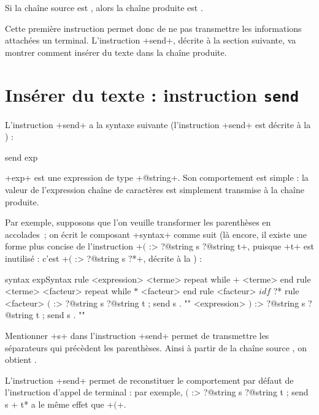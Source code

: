 Si la chaîne source est , alors la chaîne produite est .

Cette première instruction permet donc de ne pas transmettre les informations attachées un terminal. L'instruction \ggsq+send+, décrite à la section suivante, va montrer comment insérer du texte dans la chaîne produite.










\section{Insérer du texte : instruction \texttt{send}}

L'instruction \ggsq+send+ a la syntaxe suivante (l'instruction \ggsq+send+ est décrite à la ) :

\begin{galgas4}
send exp
\end{galgas4}

\ggsq+exp+ est une expression de type \ggsq+@string+. Son comportement est simple : la valeur de l'expression chaîne de caractères est simplement transmise à la chaîne produite.

Par exemple, supposons que l'on veuille transformer les parenthèses en accolades~; on écrit le composant \ggsq+syntax+ comme suit (là encore, il existe une forme plus concise de l'instruction \ggsq+$($ :> ?@string s ?@string t+, puisque \ggsq+t+ est inutilisé : c'est \ggsq+$($ :> ?@string s ?*+, décrite  à la ) :
\begin{galgas4}
syntax expSyntax {
  rule <expression> {
    <terme>
    repeat while $+$ <terme> end
  }
  rule <terme> {
    <facteur>
    repeat while $*$ <facteur> end
  }
  rule <facteur> {
    $idf$ ?*
  }
  rule <facteur> {
    $($ :> ?@string s ?@string t ; send s . "{"
    <expression>
    $)$ :> ?@string s ?@string t ; send s . "}"
  }
}
\end{galgas4}

Mentionner \ggsq+s+ dans l'instruction \ggsq+send+ permet de transmettre les séparateurs qui précèdent les parenthèses. Ainsi à partir de la chaîne source , on obtient .


L'instruction \ggsq+send+ permet de reconstituer le comportement par défaut de l'instruction d'appel de terminal : par exemple, \ggsq*$($ :> ?@string s ?@string t ; send s + t* a le même effet que \ggsq+$($+.


